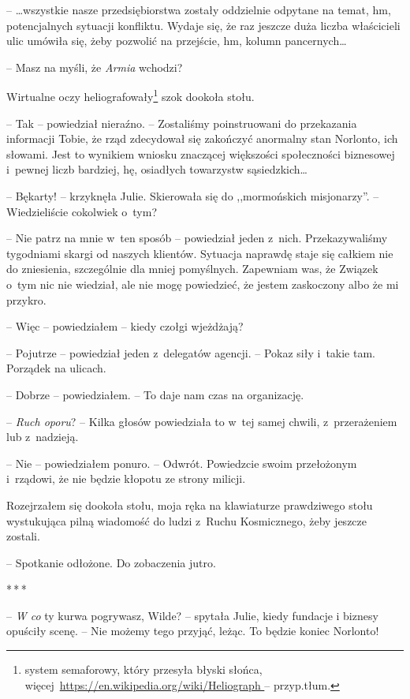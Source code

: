 \documentclass[oneside,polish,11pt,sfheadings]{mwbk}
\newcommand{\threeast}{\bigskip\par\centerline{*\,*\,*}\medskip\par}
\begin{document}
-- \ldots wszystkie nasze przedsiębiorstwa zostały oddzielnie odpytane na
temat, hm, potencjalnych sytuacji konfliktu. Wydaje się, że raz jeszcze
duża liczba właścicieli ulic umówiła się, żeby pozwolić na przejście,
hm, kolumn pancernych\ldots

-- Masz na myśli, że \emph{Armia }wchodzi?

Wirtualne oczy heliografowały\footnote{system
semaforowy, który przesyła błyski słońca,
więcej~\url{https://en.wikipedia.org/wiki/Heliograph } -- przyp.tłum.} szok dookoła stołu. 

-- Tak -- powiedział nieraźno. -- Zostaliśmy poinstruowani do przekazania
informacji Tobie, że rząd zdecydował się zakończyć anormalny stan
Norlonto, ich słowami. Jest to wynikiem wniosku znaczącej większości
społeczności biznesowej i~pewnej liczb bardziej, hę, osiadłych
towarzystw sąsiedzkich\ldots

-- Bękarty! -- krzyknęła Julie. Skierowała się do ,,mormońskich
misjonarzy''. -- Wiedzieliście cokolwiek o~tym?

-- Nie patrz na mnie w~ten sposób -- powiedział jeden z~nich.
Przekazywaliśmy tygodniami skargi od naszych klientów. Sytuacja naprawdę
staje się całkiem nie do zniesienia, szczególnie dla mniej pomyślnych.
Zapewniam was, że Związek o~tym nic nie wiedział, ale nie mogę
powiedzieć, że jestem zaskoczony albo że mi przykro.

-- Więc -- powiedziałem -- kiedy czołgi wjeżdżają?

-- Pojutrze -- powiedział jeden z~delegatów agencji. -- Pokaz siły i~takie
tam. Porządek na ulicach.

-- Dobrze -- powiedziałem. -- To daje nam czas na organizację.

-- \emph{Ruch oporu}? -- Kilka głosów powiedziała to w~tej samej chwili, z~przerażeniem lub z~nadzieją.

-- Nie -- powiedziałem ponuro. -- Odwrót. Powiedzcie swoim przełożonym i~rządowi, że nie będzie kłopotu ze strony milicji.

Rozejrzałem się dookoła stołu, moja ręka na klawiaturze prawdziwego
stołu wystukująca pilną wiadomość do ludzi z~Ruchu Kosmicznego, żeby
jeszcze zostali. 

-- Spotkanie odłożone. Do zobaczenia jutro.

\threeast

-- \emph{W co} ty kurwa pogrywasz, Wilde? -- spytała Julie, kiedy fundacje
i biznesy opuściły scenę. -- Nie możemy tego przyjąć, leżąc. To będzie
koniec Norlonto!
\end{document}
